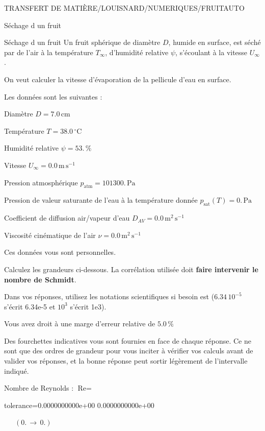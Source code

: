 \documentclass[12pt]{article}
\begin{document}
\begin{quiz}{TRANSFERT DE MATIÈRE/LOUISNARD/NUMERIQUES/FRUITAUTO}
\begin{cloze}{Séchage d un fruit}
\end{cloze} 


 \begin{cloze}{Séchage d un fruit} 
Un fruit sphérique de diamètre $D$, humide en surface, est séché par de l'air à la température $T_\infty$, d'humidité relative $\psi$, s'écoulant à la vitesse $U_\infty$.

On veut calculer la vitesse d'évaporation de la pellicule d'eau en surface.

 

Les données sont les suivantes :

 

Diamètre $D = 7.0\,  \mathrm{cm} $

Température $T = 38.0\,  \mathrm{^\circ\mathrm{C}} $

Humidité relative $\psi = 53.\, \% $

Vitesse $U_\infty = 0.0\,  \mathrm{m}\,  \mathrm{s}^{-1} $

Pression atmosphérique $p_{\text{atm}} = 101300.\,  \mathrm{Pa} $

Pression de valeur saturante de l’eau à la température donnée $p_{\text{sat}}(T) = 0.\,  \mathrm{Pa} $

Coefficient de diffusion air/vapeur d’eau $D_{AV} = 0.0\,  \mathrm{m}^{2}\,  \mathrm{s}^{-1} $

Viscosité cinématique de l’air $\nu = 0.0\,  \mathrm{m}^{2}\,  \mathrm{s}^{-1} $

Ces données vous sont personnelles.

 

Calculez les grandeurs ci-dessous. La corrélation utilisée doit \textbf{faire intervenir le nombre de Schmidt}.

Dans vos réponses, utilisez les notations scientifiques si besoin est ($6.34\, 10^{-5}$ s'écrit 6.34e-5 et $10^{3}$ s'écrit 1e3).

Vous avez droit à une marge d'erreur relative de $5.0\, \% $

Des fourchettes indicatives vous sont fournies en face de chaque réponse. Ce ne sont que des ordres de grandeur pour vous inciter à vérifier vos calculs avant de valider vos réponses, et la bonne réponse peut sortir légèrement de l'intervalle indiqué.

 

Nombre de Reynolds : $\text{Re} =  $
\begin{numerical}[points=1] 
\item[tolerance={0.0000000000e+00}] 0.0000000000e+00 
\end{numerical} 
 $\,$ 
 $ \quad (0. \, \rightarrow \, 0.) $ 


\end{cloze}
\end{quiz}
\end{document}
